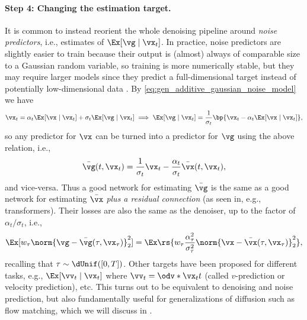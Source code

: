 \documentclass[../../book-main.tex]{subfiles}
\begin{document}
\paragraph{Step 4: Changing the estimation target.}
It is common to instead reorient the whole denoising pipeline
around \textit{noise predictors}, i.e., estimates of \(\Ex[\vg \mid
\vx_{t}]\). In practice, noise predictors are slightly easier to
train because their output is (almost) always of comparable size to a
Gaussian random variable, so training is more numerically stable, but
they may require larger models since they predict a
full-dimensional target instead of potentially low-dimensional data
\citep{li2025back}. By
\eqref{eq:gen_additive_gaussian_noise_model} we have
\begin{equation}
    \vx_{t} = \alpha_{t}\Ex[\vx \mid \vx_{t}] + \sigma_{t}\Ex[\vg
    \mid \vx_{t}] \implies \Ex[\vg \mid \vx_{t}] =
    \frac{1}{\sigma_{t}}\bp{\vx_{t} - \alpha_{t}\Ex[\vx \mid \vx_{t}]},
\end{equation}
so any predictor for \(\vx\) can be turned into a predictor
for \(\vg\) using the above relation, i.e.,
\begin{equation}
    \bar{\vg}(t, \vx_{t}) = \frac{1}{\sigma_{t}}\vx_{t} -
    \frac{\alpha_{t}}{\sigma_{t}}\bar{\vx}(t, \vx_{t}),
\end{equation}
and vice-versa. Thus a good network for estimating \(\bar{\vg}\) is
the same as a good network for estimating \(\bar{\vx}\) \textit{plus
a residual connection} (as seen in, e.g., transformers). Their losses
are also the same as the denoiser, up to the factor of
\(\alpha_{t}/\sigma_{t}\), i.e.,
\begin{equation}
    \Ex[w_{\tau}\norm{\vg - \bar{\vg}(\tau,
    \vx_{\tau})}_{2}^{2}] =
    \Ex\rs{w_{\tau}\frac{\alpha_{\tau}^{2}}{\sigma_{\tau}^{2}}\norm{\vx
    - \bar{\vx}(\tau, \vx_{\tau})}_{2}^{2}},
\end{equation}
recalling that \(\tau \sim \dUnif([0, T])\). Other targets have
been proposed for different tasks, e.g., \(\Ex[\vv_{t} \mid
\vx_{t}]\) where \(\vv_{t} = \odv*{\vx_{t}}{t}\) (called
\(v\)-prediction or velocity prediction), etc. This turns out to be
equivalent to denoising and noise prediction, but also fundamentally
useful for generalizations of diffusion such as flow matching, which
we will discuss in .
\end{document}
